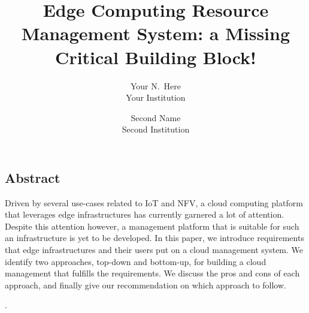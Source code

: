 \documentclass[letterpaper,twocolumn,10pt]{article}
\begin{document}
\date{}

\title{\Large Edge Computing Resource Management System: a Missing Critical Building Block!}

\author{
{\rm Your N.\ Here}\\
Your Institution
\and
{\rm Second Name}\\
Second Institution
} %

\maketitle

\thispagestyle{empty}


\subsection*{Abstract}
Driven by several use-cases related to IoT and NFV, a cloud computing platform that leverages edge infrastructures has currently garnered a lot of attention. Despite this attention however, a management platform that is suitable for such an infrastructure is yet to be developed. In this paper, we introduce requirements that edge infrastructures and their users put on a cloud management system. We identify two approaches, top-down and bottom-up, for building a cloud management that fulfills the requirements. We discuss the pros and cons of each approach, and finally give our recommendation on which approach to follow. 

.
        




% 
% 




{\footnotesize 
}

\theendnotes
\end{document}
